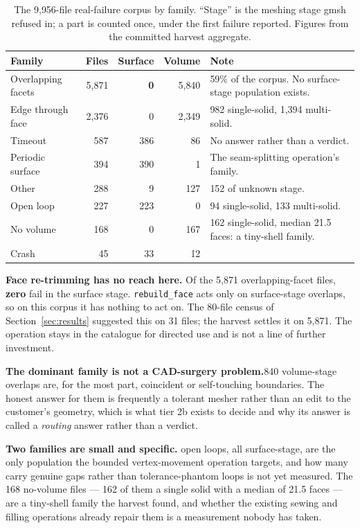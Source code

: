 \documentclass[10pt,onecolumn]{article}
\newcommand{\topic}[1]{\textbf{#1.}\hspace{0.5em}\ignorespaces}
\newcommand{\code}[1]{\texttt{\small #1}}
\begin{document}
\begin{table}[h]
\centering
\caption{The 9{,}956-file real-failure corpus by family. ``Stage'' is the meshing stage gmsh
refused in; a part is counted once, under the first failure reported. Figures from the committed
harvest aggregate.}
\label{tab:corpus}
\footnotesize
\begin{tabularx}{\textwidth}{@{}l r r r X@{}}
\toprule
\textbf{Family} & \textbf{Files} & \textbf{Surface} & \textbf{Volume} & \textbf{Note}\\
\midrule
Overlapping facets  & 5{,}871 & \textbf{0} & 5{,}840 & 59\% of the corpus. No surface-stage population exists.\\
Edge through face   & 2{,}376 & 0 & 2{,}349 & 982 single-solid, 1{,}394 multi-solid.\\
Timeout             & 587 & 386 & 86 & No answer rather than a verdict.\\
Periodic surface    & 394 & 390 & 1 & The seam-splitting operation's family.\\
Other               & 288 & 9 & 127 & 152 of unknown stage.\\
Open loop           & 227 & 223 & 0 & 94 single-solid, 133 multi-solid.\\
No volume           & 168 & 0 & 167 & 162 single-solid, median 21.5 faces: a tiny-shell family.\\
Crash               & 45 & 33 & 12 & \\
\bottomrule
\end{tabularx}
\end{table}

\topic{Face re-trimming has no reach here} Of the 5{,}871 overlapping-facet files, \textbf{zero}
fail in the surface stage. \code{rebuild\_face} acts only on surface-stage overlaps, so on this
corpus it has nothing to act on. The 80-file census of Section~\ref{sec:results} suggested this on
31 files; the harvest settles it on 5{,}871. The operation stays in the catalogue for directed use
and is not a line of further investment.

\topic{The dominant family is not a CAD-surgery problem} 5{,}840 volume-stage overlaps are, for the
most part, coincident or self-touching boundaries. The honest answer for them is frequently a
tolerant mesher rather than an edit to the customer's geometry, which is what tier 2b exists to
decide and why its answer is called a \emph{routing} answer rather than a verdict.

\topic{Two families are small and specific} 227 open loops, all surface-stage, are the only
population the bounded vertex-movement operation targets, and how many carry genuine gaps rather
than tolerance-phantom loops is not yet measured. The 168 no-volume files --- 162 of them a single
solid with a median of 21.5 faces --- are a tiny-shell family the harvest found, and whether the
existing sewing and filling operations already repair them is a measurement nobody has taken.
\end{document}
